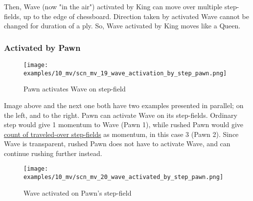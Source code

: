 Then, Wave (now "in the air") activated by King can move over multiple step-fields,
up to the edge of chessboard. Direction taken by activated Wave cannot be changed
for duration of a ply. So, Wave activated by King moves like a Queen.

\clearpage %

\subsubsection*{Activated by Pawn}
\label{sec:Miranda's veil/Wave/Movement/Activated by Pawn}

\vspace*{-1.5\baselineskip}
\noindent
\begin{figure}[!h]
\texttt{[image: examples/10\_mv/scn\_mv\_19\_wave\_activation\_by\_step\_pawn.png]}
\vspace*{-1.3\baselineskip}
\caption{Pawn activates Wave on step-field}
\label{fig:scn_mv_19_wave_activation_by_step_pawn}
\end{figure}

\vspace*{-0.5\baselineskip}
Image above and the next one both have two examples presented in parallel; on the
left, and to the right. \newline
\indent
Pawn can activate Wave on its step-fields. Ordinary step would give 1 momentum to
Wave (Pawn 1), while rushed Pawn would give
\hyperref[sec:Mayan Ascendancy/Pyramid/Momentum/Fields counting]{count of traveled-over step-fields}
as momentum, in this case 3 (Pawn 2). Since Wave is transparent, rushed Pawn does
not have to activate Wave, and can continue rushing further instead.

\clearpage %

\vspace*{-2.1\baselineskip}
\noindent
\begin{figure}[!h]
\texttt{[image: examples/10\_mv/scn\_mv\_20\_wave\_activated\_by\_step\_pawn.png]}
\caption{Wave activated on Pawn's step-field}
\label{fig:scn_mv_20_wave_activated_by_step_pawn}
\end{figure}

